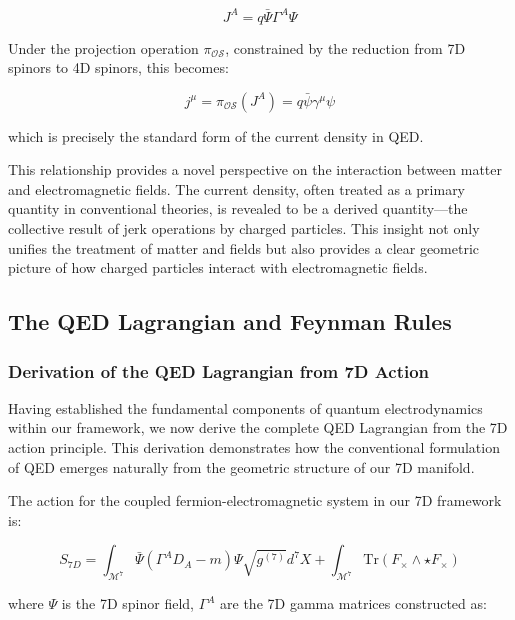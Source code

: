 \documentclass{article}
\begin{document}
\begin{equation}
J^A = q \bar{\Psi} \Gamma^A \Psi
\end{equation}

Under the projection operation $\pi_{\mathcal{OS}}$, constrained by the reduction from 7D spinors to 4D spinors, this becomes:

\begin{equation}
j^\mu = \pi_{\mathcal{OS}}(J^A) = q \bar{\psi} \gamma^\mu \psi
\end{equation}

which is precisely the standard form of the current density in QED.

This relationship provides a novel perspective on the interaction between matter and electromagnetic fields. The current density, often treated as a primary quantity in conventional theories, is revealed to be a derived quantity—the collective result of jerk operations by charged particles. This insight not only unifies the treatment of matter and fields but also provides a clear geometric picture of how charged particles interact with electromagnetic fields.

\subsection{The QED Lagrangian and Feynman Rules}

\subsubsection{Derivation of the QED Lagrangian from 7D Action}

Having established the fundamental components of quantum electrodynamics within our framework, we now derive the complete QED Lagrangian from the 7D action principle. This derivation demonstrates how the conventional formulation of QED emerges naturally from the geometric structure of our 7D manifold.

The action for the coupled fermion-electromagnetic system in our 7D framework is:

\begin{equation}
S_{7D} = \int_{\mathcal{M}^7} \bar{\Psi} (\Gamma^A D_A - m) \Psi \sqrt{g^{(7)}} d^7X + \int_{\mathcal{M}^7} \text{Tr}(F_{\times} \wedge \star F_{\times})
\end{equation}

where $\Psi$ is the 7D spinor field, $\Gamma^A$ are the 7D gamma matrices constructed as:
\end{document}
